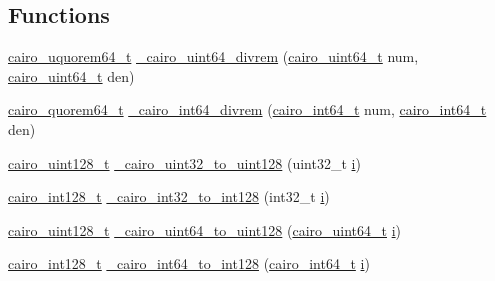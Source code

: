 \subsection*{Functions}
\begin{DoxyCompactItemize}
\item 
\hyperlink{cairo-wideint-private_8h_aab2ad7e0f3441227d9339be2baa8b986}{cairo\+\_\+uquorem64\+\_\+t} \hyperlink{cairo-wideint_8c_a621ed7ef4c3a60376cf0296db7a9cbef}{\+\_\+cairo\+\_\+uint64\+\_\+divrem} (\hyperlink{cairo-wideint-private_8h_addac97960d28a0f1b58a5abefd21b14b}{cairo\+\_\+uint64\+\_\+t} num, \hyperlink{cairo-wideint-private_8h_addac97960d28a0f1b58a5abefd21b14b}{cairo\+\_\+uint64\+\_\+t} den)
\item 
\hyperlink{cairo-wideint-private_8h_af1cd8d1d4bd4c1ec92c27c22e8f0123b}{cairo\+\_\+quorem64\+\_\+t} \hyperlink{cairo-wideint_8c_acf38aeea380bc28e82e1fdadbea0eee9}{\+\_\+cairo\+\_\+int64\+\_\+divrem} (\hyperlink{cairo-wideint-private_8h_a31b93307f43703e28eef43fad0166834}{cairo\+\_\+int64\+\_\+t} num, \hyperlink{cairo-wideint-private_8h_a31b93307f43703e28eef43fad0166834}{cairo\+\_\+int64\+\_\+t} den)
\item 
\hyperlink{cairo-wideint-private_8h_ab99b9c539c5f08b381ec3797b3fcd872}{cairo\+\_\+uint128\+\_\+t} \hyperlink{cairo-wideint_8c_a23416e4346eb40467a88a873acc55057}{\+\_\+cairo\+\_\+uint32\+\_\+to\+\_\+uint128} (uint32\+\_\+t \hyperlink{lte__uplink__power__control_8m_a6f6ccfcf58b31cb6412107d9d5281426}{i})
\item 
\hyperlink{cairo-wideint-private_8h_adb77a91a0053b771957b37c1a822a228}{cairo\+\_\+int128\+\_\+t} \hyperlink{cairo-wideint_8c_aa222b85c60a4254f6e530c510f4b46b7}{\+\_\+cairo\+\_\+int32\+\_\+to\+\_\+int128} (int32\+\_\+t \hyperlink{lte__uplink__power__control_8m_a6f6ccfcf58b31cb6412107d9d5281426}{i})
\item 
\hyperlink{cairo-wideint-private_8h_ab99b9c539c5f08b381ec3797b3fcd872}{cairo\+\_\+uint128\+\_\+t} \hyperlink{cairo-wideint_8c_a333f5c9adbc0bb26a97c016cf09692f4}{\+\_\+cairo\+\_\+uint64\+\_\+to\+\_\+uint128} (\hyperlink{cairo-wideint-private_8h_addac97960d28a0f1b58a5abefd21b14b}{cairo\+\_\+uint64\+\_\+t} \hyperlink{lte__uplink__power__control_8m_a6f6ccfcf58b31cb6412107d9d5281426}{i})
\item 
\hyperlink{cairo-wideint-private_8h_adb77a91a0053b771957b37c1a822a228}{cairo\+\_\+int128\+\_\+t} \hyperlink{cairo-wideint_8c_aaa23ec14fa75f23077a9ac94096e0f8d}{\+\_\+cairo\+\_\+int64\+\_\+to\+\_\+int128} (\hyperlink{cairo-wideint-private_8h_a31b93307f43703e28eef43fad0166834}{cairo\+\_\+int64\+\_\+t} \hyperlink{lte__uplink__power__control_8m_a6f6ccfcf58b31cb6412107d9d5281426}{i})

\end{DoxyCompactItemize}
